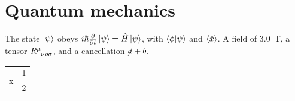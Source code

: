 \documentclass[11pt]{article}
\begin{document}
\linenumbers
\section{Quantum mechanics}
The state $\ket{\psi}$ obeys $i\hbar\pdv{t}\ket{\psi} = \hat H\ket{\psi}$, with
$\braket{\phi|\psi}$ and $\expval{\hat x}$. A field of \SI{3.0}{\tesla},
a tensor $\tensor{R}{^\mu_{\nu\rho\sigma}}$, and a cancellation $\cancel{a}+b$.
\begin{tabular}{|c|c|}\hline\multirow{2}{*}{x} & 1\\ & 2\\\hline\end{tabular}
\lipsum[1]
\end{document}

